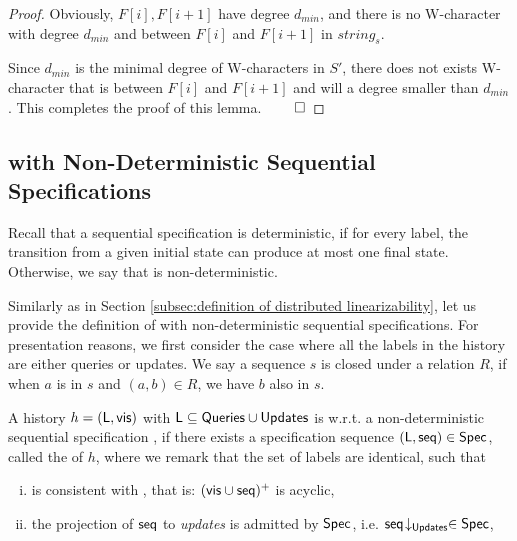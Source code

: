 {\begin {proof}
Obviously, $F[i],F[i+1]$ have degree $d_{min}$, and there is no W-character with degree $d_{min}$ and between $F[i]$ and $F[i+1]$ in $string_s$.

Since $d_{min}$ is the minimal degree of W-characters in $S'$, there does not exists W-character that is between $F[i]$ and $F[i+1]$ and will a degree smaller than $d_{min}$. This completes the proof of this lemma. $\qed$
\end {proof}






\subsection{\crdtlin{} with Non-Deterministic Sequential Specifications}
\label{subsec:appendix RA-linearizability with non-deterministic sequential specifications}

Recall that a sequential specification \Spec{} is deterministic, if for every label, the transition from a given initial state can produce at most one final state. Otherwise, we say that \Spec{} is non-deterministic.

Similarly as in Section \ref{subsec:definition of distributed linearizability}, let us provide the definition of \crdtlin{} with non-deterministic sequential specifications. For presentation reasons, we first consider the case where all the labels in the history are either queries or updates. We say a sequence $s$ is closed under a relation $R$, if when $a$ is in $s$ and $(a,b) \in R$, we have $b$ also in $s$.

\begin{definition}
\label{definition:ralinearizability1 with non-deterministic specifications}
A history $h = (\mathsf{L},\mathsf{vis})$ with $\mathsf{L}\subseteq \mathsf{Queries}\cup\mathsf{Updates}$ is \crdtlinearizable{} w.r.t. a non-deterministic sequential specification \Spec{}, if there exists a specification sequence $(\mathsf{L}, \mathsf{seq}) \in \mathsf{Spec}{}$, called the \emph{\crdtlinearization{}} of $h$, where we remark that the set of labels are identical, such that
\begin{enumerate}[(i)]
\item \aseqord{} is consistent with  \avisord{}, that is: $(\mathsf{vis} \cup \mathsf{seq})^{+}$ is acyclic,

\item the projection of $\mathsf{seq}$ to \emph{updates} is admitted by $\mathsf{Spec}$, i.e. $\mathsf{seq}\!\downarrow_{\mathsf{Updates}} \in \mathsf{Spec}$,


\end{enumerate}
\end{definition}}

